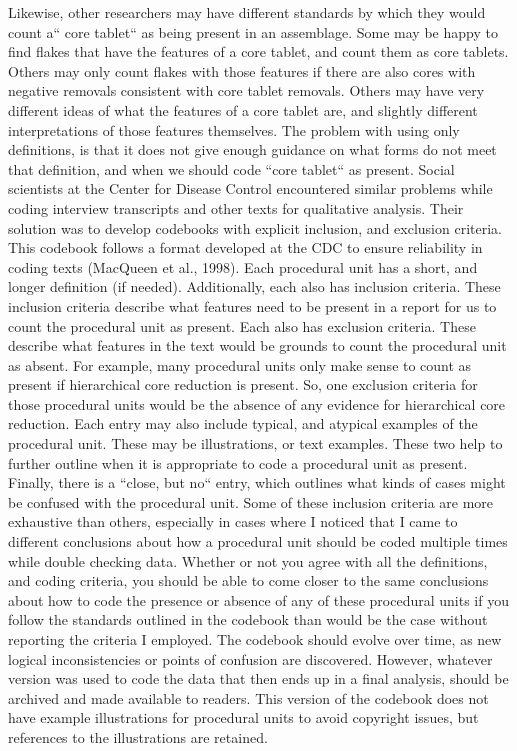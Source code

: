 \documentclass[
]{article}
\begin{document}
Likewise, other researchers may have different standards by which they
would count a`` core tablet`` as being present in an assemblage. Some
may be happy to find flakes that have the features of a core tablet, and
count them as core tablets. Others may only count flakes with those
features if there are also cores with negative removals consistent with
core tablet removals. Others may have very different ideas of what the
features of a core tablet are, and slightly different interpretations of
those features themselves. The problem with using only definitions, is
that it does not give enough guidance on what forms do not meet that
definition, and when we should code ``core tablet`` as present. Social
scientists at the Center for Disease Control encountered similar
problems while coding interview transcripts and other texts for
qualitative analysis. Their solution was to develop codebooks with
explicit inclusion, and exclusion criteria. This codebook follows a
format developed at the CDC to ensure reliability in coding texts
(MacQueen et al., 1998). Each procedural unit has a short, and longer
definition (if needed). Additionally, each also has inclusion criteria.
These inclusion criteria describe what features need to be present in a
report for us to count the procedural unit as present. Each also has
exclusion criteria. These describe what features in the text would be
grounds to count the procedural unit as absent. For example, many
procedural units only make sense to count as present if hierarchical
core reduction is present. So, one exclusion criteria for those
procedural units would be the absence of any evidence for hierarchical
core reduction. Each entry may also include typical, and atypical
examples of the procedural unit. These may be illustrations, or text
examples. These two help to further outline when it is appropriate to
code a procedural unit as present. Finally, there is a ``close, but no``
entry, which outlines what kinds of cases might be confused with the
procedural unit. Some of these inclusion criteria are more exhaustive
than others, especially in cases where I noticed that I came to
different conclusions about how a procedural unit should be coded
multiple times while double checking data. Whether or not you agree with
all the definitions, and coding criteria, you should be able to come
closer to the same conclusions about how to code the presence or absence
of any of these procedural units if you follow the standards outlined in
the codebook than would be the case without reporting the criteria I
employed. The codebook should evolve over time, as new logical
inconsistencies or points of confusion are discovered. However, whatever
version was used to code the data that then ends up in a final analysis,
should be archived and made available to readers. This version of the
codebook does not have example illustrations for procedural units to
avoid copyright issues, but references to the illustrations are
retained.
\end{document}
